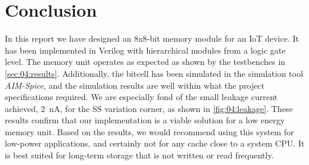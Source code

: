 \section{Conclusion}    \label{sec:06:conclusion}
In this report we have designed an 8x8-bit memory module for an IoT device. It has been implemented in Verilog with hierarchical modules from a logic gate level. The memory unit operates as expected as shown by the testbenches in \autoref{sec:04:results}. Additionally, the bitcell has been simulated in the simulation tool \textit{AIM-Spice}, and the simulation results are well within what the project specifications required. We are especially fond of the small leakage current achieved, \SI{2}{nA}, for the SS variation corner, as shown in \autoref{fig:04:leakage}. These results confirm that our implementation is a viable solution for a low energy memory unit. Based on the results, we would recommend using this system for low-power applications, and certainly not for any cache close to a system CPU. It is best suited for long-term storage that is not written or read frequently.

